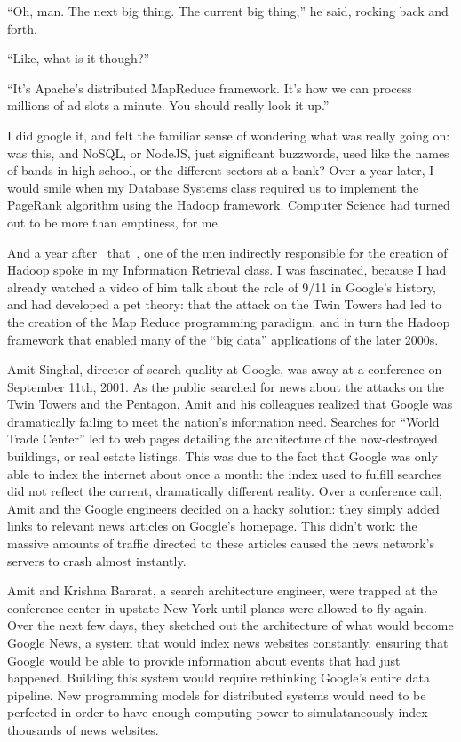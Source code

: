 \documentclass[12pt]{article}
\begin{document}
``Oh, man.  The next big thing.  The current big thing,'' he said,
rocking back and forth.

``Like, what is it though?''

``It's Apache's distributed MapReduce framework.  It's how we can process
millions of ad slots a minute.  You should really look it up.''

I did google it, and felt the familiar sense of wondering what was
really going on: was this, and NoSQL, or NodeJS, just significant
buzzwords, used like the names of bands in high school, or the different
sectors at a bank?   Over a year later, I would smile when my
Database Systems class required us to implement the PageRank algorithm
using the Hadoop framework.  Computer Science had turned out to be more
than emptiness, for me.

And a year after ~that~, one of the men indirectly responsible for the
creation of Hadoop spoke in my Information Retrieval class.  I was
fascinated, because I had already watched a video of him talk about the
role of 9/11 in Google's history, and had developed a pet theory: that
the attack on the Twin Towers had led to the creation of the Map Reduce
programming paradigm, and in turn the Hadoop framework that enabled many
of the ``big data'' applications of the later 2000s.

Amit Singhal, director of search quality at Google, was away at a
conference on September 11th, 2001. As the public searched for news
about the attacks on the Twin Towers and the Pentagon, Amit and his
colleagues realized that Google was dramatically failing to meet the nation's
information need. Searches for ``World Trade Center'' led to web pages
detailing the architecture of the now-destroyed buildings, or real
estate listings.  This was due to the fact that Google was only able to
index the internet about once a month: the index used to fulfill
searches did not reflect the current, dramatically different reality.
Over a conference call, Amit and the Google engineers decided on a hacky
solution: they simply added links to relevant news articles on Google's
homepage.  This didn't work: the massive amounts of traffic directed to
these articles caused the news network's servers to crash almost
instantly.

Amit and Krishna Bararat, a search architecture engineer, were trapped
at the conference center in upstate New York until planes were allowed
to fly again.  Over the next few days, they sketched out the
architecture of what would become Google News, a system that would index
news websites constantly, ensuring that Google would be able to provide
information about events that had just happened.  Building this system
would require rethinking Google's entire data pipeline.  New programming
models for distributed systems would need to be perfected in order to
have enough computing power to simulataneously index thousands of news
websites.
\end{document}
